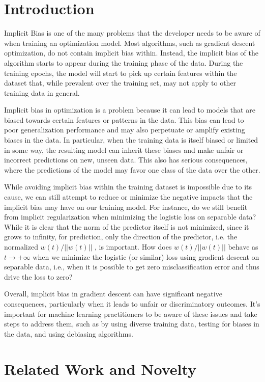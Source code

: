 \chapter {Introduction}

Implicit Bias is one of the many problems that the developer needs to be aware of when training an optimization model. Most algorithms, such as gradient descent optimization, do not contain implicit bias within. Instead, the implicit bias of the algorithm starts to appear during the training phase of the data. During the training epochs, the model will start to pick up certain features within the dataset that, while prevalent over the training set, may not apply to other training data in general.
 
Implicit bias in optimization is a problem because it can lead to models that are biased towards certain features or patterns in the data. This bias can lead to poor generalization performance and may also perpetuate or amplify existing biases in the data. In particular, when the training data is itself biased or limited in some way, the resulting model can inherit these biases and make unfair or incorrect predictions on new, unseen data. This also has serious consequences, where the predictions of the model may favor one class of the data over the other.

While avoiding implicit bias within the training dataset is impossible due to its cause, we can still attempt to reduce or minimize the negative impacts that the implicit bias may have on our training model. For instance, do we still benefit from implicit regularization when minimizing the logistic loss on separable data? While it is clear that the norm of the predictor itself is not minimized, since it grows to infinity, for prediction, only the direction of the predictor, i.e. the normalized $w(t)/ ||w(t)||$ , is important. How does $w(t)/ ||w(t)||$ behave as $t \rightarrow +\infty$ when we minimize the logistic (or similar) loss using gradient descent on separable data, i.e., when it is possible to get zero misclassification error and thus drive the loss to zero?

Overall, implicit bias in gradient descent can have significant negative consequences, particularly when it leads to unfair or discriminatory outcomes. It's important for machine learning practitioners to be aware of these issues and take steps to address them, such as by using diverse training data, testing for biases in the data, and using debiasing algorithms.

\chapter{Related Work and Novelty}

